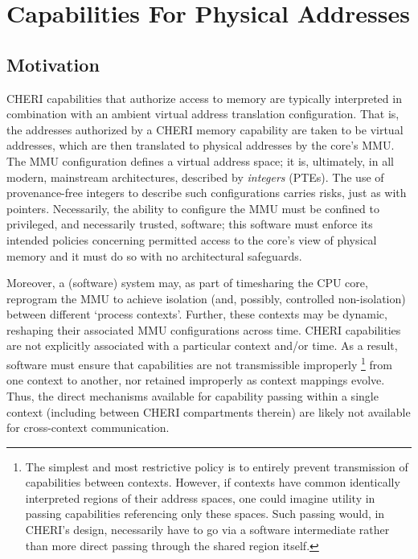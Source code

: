 
\section{Capabilities For Physical Addresses} %
\label{app:exp:physcap}

\subsection{Motivation}

CHERI capabilities that authorize access to memory are typically interpreted
in combination with an ambient virtual address translation configuration.
That is, the addresses authorized by a CHERI memory capability are taken to
be virtual addresses, which are then translated to physical addresses by the
core's MMU.  The MMU configuration defines a virtual address space; it is,
ultimately, in all modern, mainstream architectures, described by
\emph{integers} (PTEs).
The use of provenance-free integers to describe such configurations carries
risks, just as with pointers.  Necessarily, the ability to configure the MMU
must be confined to privileged, and necessarily trusted, software; this
software must enforce its intended policies concerning permitted access to
the core's view of physical memory and it must do so with no architectural
safeguards.

Moreover, a (software) system may, as part of timesharing the CPU core,
reprogram the MMU to achieve isolation (and, possibly, controlled
non-isolation) between different `process contexts'.  Further, these
contexts may be dynamic, reshaping their associated MMU configurations
across time.  CHERI capabilities are not explicitly associated with a
particular context and/or time.  As a result, software must ensure that
capabilities are not transmissible improperly%
%
\footnote{The simplest and most restrictive policy is to entirely prevent
transmission of capabilities between contexts.  However, if contexts have
common identically interpreted regions of their address spaces, one could
imagine utility in passing capabilities referencing only these spaces.  Such
passing would, in CHERI's design, necessarily have to go via a software
intermediate rather than more direct passing through the shared region
itself.}
%
from one context to another, nor retained improperly as context mappings
evolve.  Thus, the direct mechanisms available for capability passing within
a single context (including between CHERI compartments therein) are likely
not available for cross-context communication.

